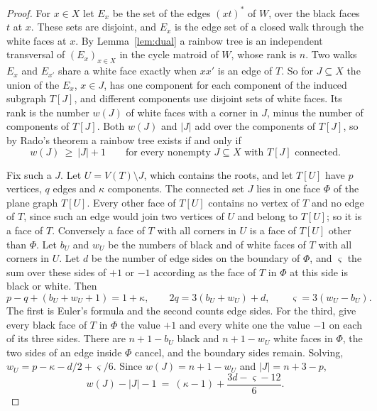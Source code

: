 \documentclass[10pt]{amsart}
\numberwithin{equation}{section}
\theoremstyle{definition}
\theoremstyle{remark}
\begin{document}
\begin{proof}
For $x\in X$ let $E_x$ be the set of the edges $(xt)^*$ of $W$, over the black faces $t$ at $x$.
These sets are disjoint, and $E_x$ is the edge set of a closed walk through the white faces at $x$.
By Lemma~\ref{lem:dual} a rainbow tree is an independent transversal of $(E_x)_{x\in X}$ in the cycle matroid of $W$, whose rank is $n$.
Two walks $E_x$ and $E_{x'}$ share a white face exactly when $xx'$ is an edge of $T$.
So for $J\subseteq X$ the union of the $E_x$, $x\in J$, has one component for each component of the induced subgraph $T[J]$, and different components use disjoint sets of white faces.
Its rank is the number $w(J)$ of white faces with a corner in $J$, minus the number of components of $T[J]$.
Both $w(J)$ and $|J|$ add over the components of $T[J]$, so by Rado's theorem a rainbow tree exists if and only if
\begin{equation}\label{eq:rado}
w(J)\ \ge\ |J|+1\qquad\text{for every nonempty } J\subseteq X \text{ with } T[J] \text{ connected.}
\end{equation}

Fix such a $J$.
Let $U=V(T)\setminus J$, which contains the roots, and let $T[U]$ have $p$ vertices, $q$ edges and $\kappa$ components.
The connected set $J$ lies in one face $\Phi$ of the plane graph $T[U]$.
Every other face of $T[U]$ contains no vertex of $T$ and no edge of $T$, since such an edge would join two vertices of $U$ and belong to $T[U]$; so it is a face of $T$.
Conversely a face of $T$ with all corners in $U$ is a face of $T[U]$ other than $\Phi$.
Let $b_U$ and $w_U$ be the numbers of black and of white faces of $T$ with all corners in $U$.
Let $d$ be the number of edge sides on the boundary of $\Phi$, and $\varsigma$ the sum over these sides of $+1$ or $-1$ according as the face of $T$ in $\Phi$ at this side is black or white.
Then
\[
p-q+(b_U+w_U+1)=1+\kappa,\qquad 2q=3(b_U+w_U)+d,\qquad \varsigma=3(w_U-b_U).
\]
The first is Euler's formula and the second counts edge sides.
For the third, give every black face of $T$ in $\Phi$ the value $+1$ and every white one the value $-1$ on each of its three sides.
There are $n+1-b_U$ black and $n+1-w_U$ white faces in $\Phi$, the two sides of an edge inside $\Phi$ cancel, and the boundary sides remain.
Solving, $w_U=p-\kappa-d/2+\varsigma/6$.
Since $w(J)=n+1-w_U$ and $|J|=n+3-p$,
\begin{equation}\label{eq:euler}
w(J)-|J|-1\ =\ (\kappa-1)+\frac{3d-\varsigma-12}{6}.
\end{equation}


\end{proof}
\end{document}
